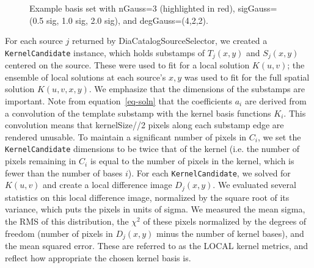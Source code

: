 \documentclass[prd, nofootinbib, floatfix, 11pt,tightenlines,times]{article}
\begin{document}
\begin{figure}
\caption{Example basis set with nGauss=3 (highlighted in red),
  sigGauss=(0.5 sig, 1.0 sig, 2.0 sig), and degGauss=(4,2,2).}
\label{basis}
\end{figure}

For each source $j$ returned by DiaCatalogSourceSelector, we created a
{\tt KernelCandidate} instance, which holds substamps of $T_j(x,y)$
and $S_j(x,y)$ centered on the source.  These were used to fit for a
local solution $K(u,v)$; the ensemble of local solutions at each
source's $x,y$ was used to fit for the full spatial solution
$K(u,v,x,y)$.  We emphasize that the dimensions of the substamps are
important.  Note from equation~\ref{eq-soln} that the coefficients
$a_i$ are derived from a convolution of the template substamp with the
kernel basis functions $K_i$.  This convolution means that
kernelSize//2 pixels along each substamp edge are rendered unusable.
To maintain a significant number of pixels in $C_i$, we set the {\tt
  KernelCandidate} dimensions to be twice that of the kernel (i.e. the
number of pixels remaining in $C_i$ is equal to the number of pixels
in the kernel, which is fewer than the number of bases $i$).  For each
{\tt KernelCandidate}, we solved for $K(u,v)$ and create a local
difference image $D_j(x,y)$.  We evaluated several statistics on this
local difference image, normalized by the square root of its variance,
which puts the pixels in units of sigma.  We measured the mean sigma,
the RMS of this distribution, the $\chi^2$ of these pixels normalized
by the degrees of freedom (number of pixels in $D_j(x,y)$ minus the
number of kernel bases), and the mean squared error.  These are
referred to as the LOCAL kernel metrics, and reflect how appropriate
the chosen kernel basis is.
\end{document}
